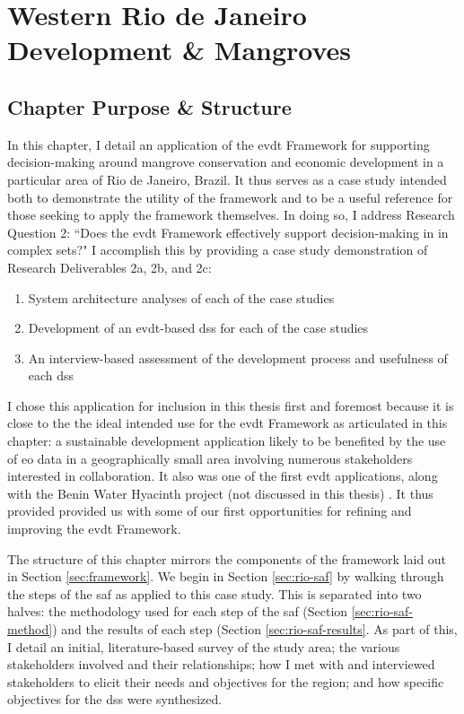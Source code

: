 \chapter{Western Rio de Janeiro Development \& Mangroves} \label{ch:mangroves}

\section{Chapter Purpose \& Structure}

In this chapter, I detail an application of the \acf{evdt} Framework for supporting decision-making around mangrove conservation and economic development in a particular area of Rio de Janeiro, Brazil. It thus serves as a case study intended both to demonstrate the utility of the framework and to be a useful reference for those seeking to apply the framework themselves. In doing so, I address Research Question 2: ``Does the \ac{evdt} Framework effectively support decision-making in in complex \ac{sets}?" I accomplish this by providing a case study demonstration of Research Deliverables 2a, 2b, and 2c: 

\begin{enumerate}[label=\emph{\alph*},itemsep=0pt,parsep=0pt]
	\item{System architecture analyses of each of the case studies} 
	\item{Development of an \ac{evdt}-based \acf{dss} for each of the case studies} 
	\item{An interview-based assessment of the development process and usefulness of each \ac{dss}} 
\end{enumerate}

I chose this application for inclusion in this thesis first and foremost because it is close to the the ideal intended use for the \ac{evdt} Framework as articulated in this chapter: a sustainable development application likely to be benefited by the use of \acf{eo} data in a geographically small area involving numerous stakeholders interested in collaboration. It also was one of the first \ac{evdt} applications, along with the Benin Water Hyacinth project (not discussed in this thesis) \cite{ovienmhadaEarthObservationTechnology2020, ovienmhadaInclusiveDesignEarth2021}. It thus provided provided us with some of our first opportunities for refining and improving the \ac{evdt} Framework.
	
The structure of this chapter mirrors the components of the framework laid out in Section \ref{sec:framework}. We begin in Section \ref{sec:rio-saf} by walking through the steps of the \acf{saf} as applied to this case study. This is separated into two halves: the methodology used for each step of the \ac{saf} (Section \ref{sec:rio-saf-method}) and the results of each step (Section \ref{sec:rio-saf-results}. As part of this, I detail an initial, literature-based survey of the study area; the various stakeholders involved and their relationships; how I met with and interviewed stakeholders to elicit their needs and objectives for the region; and how specific objectives for the \ac{dss} were synthesized. 

